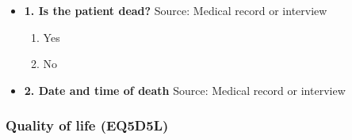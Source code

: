 \documentclass[
]{scrartcl}
\providecommand{\tightlist}{%
  \setlength{\itemsep}{0pt}\setlength{\parskip}{0pt}}\usepackage{longtable,booktabs,array}
\begin{document}
\begin{itemize}
\tightlist
\item
  \textbf{1. Is the patient dead?} Source: Medical record or interview

  \begin{enumerate}
  \def\labelenumi{\arabic{enumi}.}
  \tightlist
  \item
    Yes
  \item
    No
  \end{enumerate}
\item
  \textbf{2. Date and time of death} Source: Medical record or interview
\end{itemize}

\hypertarget{quality-of-life-eq5d5l}{%
\subsubsection{Quality of life (EQ5D5L)}\label{quality-of-life-eq5d5l}}
\end{document}
